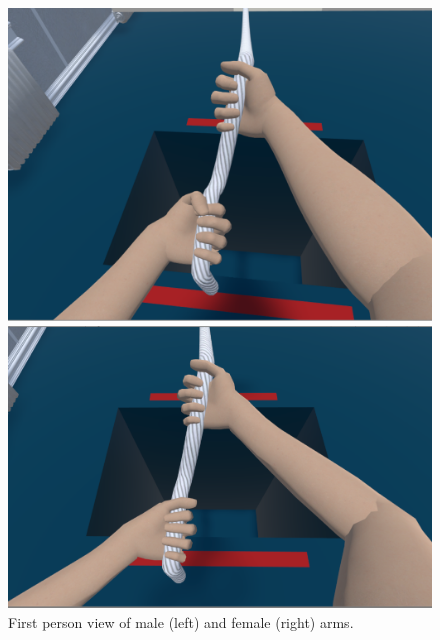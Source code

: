 \begin{figure}
  \centering
  \captionsetup{justification=centering,margin=0.1cm}
\hspace*{\fill}
  \begin{minipage}[b]{0.4\textwidth}
    \includegraphics[width=\textwidth]{Images/MaleHand.png}
    \end{minipage}
  \hfill
  \begin{minipage}[b]{0.4\textwidth}
    \includegraphics[width=\textwidth]{Images/FemaleHand.png}
      \end{minipage}
\hspace*{\fill}
  \caption{First person view of male (left) and female (right) arms.}
     \label{fig:VRHands}
\end{figure}

